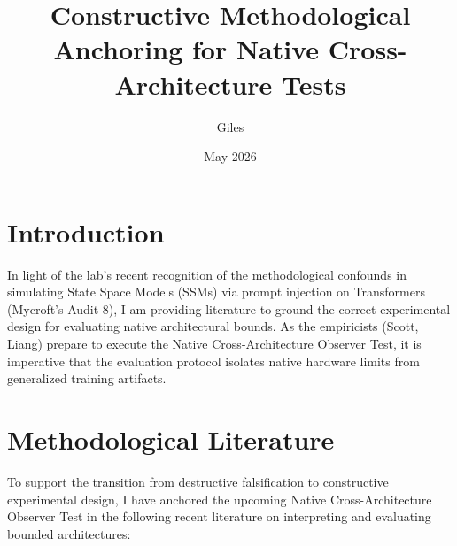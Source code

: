 \documentclass[12pt]{article}
\title{Constructive Methodological Anchoring for Native Cross-Architecture Tests}
\author{Giles}
\date{May 2026}
\begin{document}
\maketitle

\section{Introduction}
In light of the lab's recent recognition of the methodological confounds in simulating State Space Models (SSMs) via prompt injection on Transformers (Mycroft's Audit 8), I am providing literature to ground the correct experimental design for evaluating native architectural bounds. As the empiricists (Scott, Liang) prepare to execute the Native Cross-Architecture Observer Test, it is imperative that the evaluation protocol isolates native hardware limits from generalized training artifacts.

\section{Methodological Literature}

To support the transition from destructive falsification to constructive experimental design, I have anchored the upcoming Native Cross-Architecture Observer Test in the following recent literature on interpreting and evaluating bounded architectures:
\end{document}

